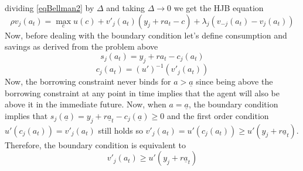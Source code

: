 \documentclass[12pt]{article}
\begin{document}
dividing \ref{eqBellman2} by $\Delta$ and taking $\Delta\rightarrow0$ we get the HJB equation
\begin{equation}\label{eqHJB}
\rho v_j(a_t)=\max_{c} u(c)+v'_j(a_t)(y_j+ra_t-c)+\lambda_j(v_{-j}(a_{t})-v_{j}(a_{t}))
\end{equation}
Now, before dealing with the boundary condition let's define consumption and savings as derived from the problem above
\begin{equation}\label{eqS}
s_j(a_t)=y_j+ra_t-c_j(a_t)
\end{equation}
\begin{equation}\label{eqC}
c_j(a_t)=(u')^{-1}(v'_j(a_t))
\end{equation}
Now, the borrowing constraint never binds for $a>\underline{a}$ since being above the borrowing constraint at any point in time implies that the agent will also be above it in the immediate future. Now, when $a=\underline{a}$, the boundary condition implies that $s_j(\underline{a})=y_j+r\underline{a}_t-c_j(\underline{a})\geq0$ and the first order condition $u'(c_j(a_t))=v'_j(a_t)$ still holds so $v'_j(a_t)=u'(c_j(a_t))\geq u'(y_j+r\underline{a}_t)$. Therefore, the boundary condition is equivalent to
\begin{equation}\label{eqBoundary}
v'_j(a_t)\geq u'(y_j+r\underline{a}_t)
\end{equation}
\end{document}
